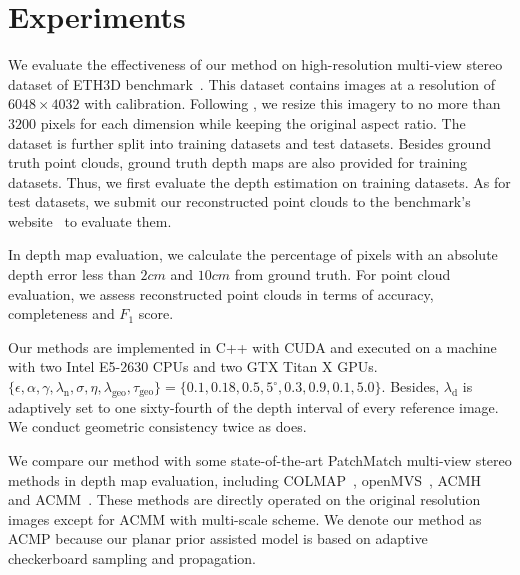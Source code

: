 \documentclass[letterpaper]{article} %
\begin{document}
\section{Experiments}

 We evaluate the effectiveness of our method on high-resolution multi-view stereo dataset of ETH3D benchmark~\cite{Schops2017Multi}. This dataset contains images at a resolution of $6048\times4032$ with calibration. Following \cite{Schonberger2016Pixelwise,Xu2018Multi}, we resize this imagery to no more than $3200$ pixels for each dimension while keeping the original aspect ratio. The dataset is further split into training datasets and test datasets. Besides ground truth point clouds, ground truth depth maps are also provided for training datasets. Thus, we first evaluate the depth estimation on training datasets. As for test datasets, we submit our reconstructed point clouds to the benchmark's website~\cite{Schops2017ETH3D} to evaluate them.

 In depth map evaluation, we calculate the percentage of pixels with an absolute depth error less than $2cm$ and $10cm$ from ground truth. For point cloud evaluation, we assess reconstructed point clouds in terms of accuracy, completeness and $F_{1}$ score.

 Our methods are implemented in C++ with CUDA and executed on a machine with two Intel E5-2630 CPUs and two GTX Titan X GPUs. $\{\epsilon,\alpha,\gamma, \lambda_\text{n}, \sigma,\eta,\lambda_\text{geo},\tau_\text{geo}\}=\{0.1,0.18,0.5,5^\circ,0.3,0.9,0.1,5.0\}$. Besides, $\lambda_\text{d}$ is adaptively set to one sixty-fourth of the depth interval of every reference image. We conduct geometric consistency twice as \cite{Xu2018Multi} does.

 We compare our method with some state-of-the-art PatchMatch multi-view stereo methods in depth map evaluation, including COLMAP~\cite{Schonberger2016Pixelwise}, openMVS~\cite{openMVS}, ACMH~\cite{Xu2018Multi} and ACMM~\cite{Xu2018Multi}. These methods are directly operated on the original resolution images except for ACMM with multi-scale scheme. We denote our method as ACMP because our planar prior assisted model is based on adaptive checkerboard sampling and propagation.
\end{document}
